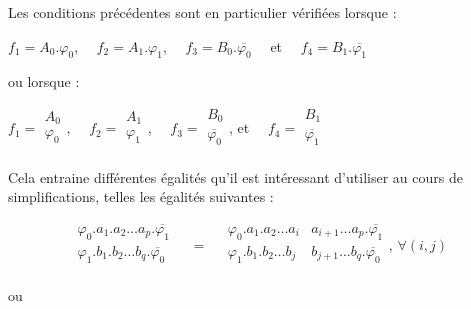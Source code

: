 Les conditions précédentes sont en particulier vérifiées lorsque : 

\medskip

\centerline {
    $ f_1 = A_0 . \varphi_0$, $\quad  f_2 = A_1 . \varphi_1$, $\quad f_3 = B_0 . \overline{\varphi_0}\quad $ et $\quad f_4 = B_1 . \overline{\varphi_1} $
} 

\medskip 

ou lorsque :

\centerline { 
$ f_1 = \begin{array}{|c|} A_0 \\ \varphi_0 \\ \end{array}$, $\quad f_2 = \begin{array}{|c|} A_1 \\ \varphi_1 \\ \end{array}$, $\quad f_3 = \begin{array}{|c|} B_0 \\ \overline{\varphi_0} \\\end{array}$, et $\quad f_4 = \begin{array}{|c|} B_1 \\ \overline{\varphi_1} \\ \end{array} $   
}

\medskip

Cela entraine différentes égalités qu'il est intéressant d'utiliser au cours de simplifications, telles les égalités suivantes :

\medskip
 
 \[
 \begin{array}{|c|} 
 	\varphi_0 . a_1 . a_2 \ldots a_p . \overline{\varphi_1} \\
 	\varphi_1 . b_1 . b_2 \ldots b_q . \overline{\varphi_0} \\
 \end{array} 
      \quad = \quad \begin{array}{|c|c|} 
                        \varphi_0 . a_1 . a_2 \ldots a_i & a_{i+1} \ldots a_p . \overline{\varphi_1} \\ 
                        \varphi_1 . b_1 . b_2 \ldots b_j & b_{j+1} \ldots b_q . \overline{\varphi_0} \\ 
                    \end{array}\text{, } \forall (i, j) 
 \]
 
ou 

